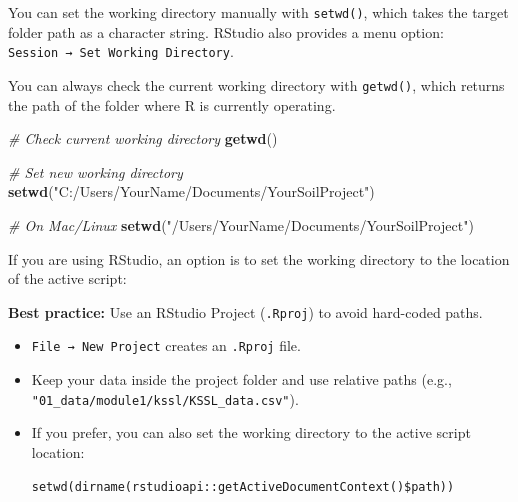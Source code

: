 \documentclass[
  10pt,
  b5paper,
  oneside]{book}
\newenvironment{Shaded}{\begin{snugshade}}{\end{snugshade}}
\newcommand{\CommentTok}[1]{\textcolor[rgb]{0.56,0.35,0.01}{\textit{#1}}}
\newcommand{\FunctionTok}[1]{\textcolor[rgb]{0.13,0.29,0.53}{\textbf{#1}}}
\newcommand{\NormalTok}[1]{#1}
\newcommand{\SpecialCharTok}[1]{\textcolor[rgb]{0.81,0.36,0.00}{\textbf{#1}}}
\newcommand{\StringTok}[1]{\textcolor[rgb]{0.31,0.60,0.02}{#1}}
\begin{document}
You can set the working directory manually with \texttt{setwd()}, which takes the target folder path as a character string.
RStudio also provides a menu option: \texttt{Session\ →\ Set\ Working\ Directory}.

You can always check the current working directory with \texttt{getwd()}, which returns the path of the folder where R is currently operating.

\begin{Shaded}
\begin{Highlighting}[]
\CommentTok{\# Check current working directory}
\FunctionTok{getwd}\NormalTok{()}

\CommentTok{\# Set new working directory}
\FunctionTok{setwd}\NormalTok{(}\StringTok{"C:/Users/YourName/Documents/YourSoilProject"}\NormalTok{)}

\CommentTok{\# On Mac/Linux}
\FunctionTok{setwd}\NormalTok{(}\StringTok{"/Users/YourName/Documents/YourSoilProject"}\NormalTok{)}
\end{Highlighting}
\end{Shaded}

If you are using RStudio, an option is to set the working directory to the location of the active script:

\begin{Shaded}
\end{Shaded}

\textbf{Best practice:} Use an RStudio Project (\texttt{.Rproj}) to avoid hard-coded paths.

\begin{itemize}
\item
  \texttt{File\ →\ New\ Project} creates an \texttt{.Rproj} file.
\item
  Keep your data inside the project folder and use relative paths (e.g., \texttt{"01\_data/module1/kssl/KSSL\_data.csv"}).
\item
  If you prefer, you can also set the working directory to the active script location:

  \texttt{setwd(dirname(rstudioapi::getActiveDocumentContext()\$path))}
\end{itemize}
\end{document}
